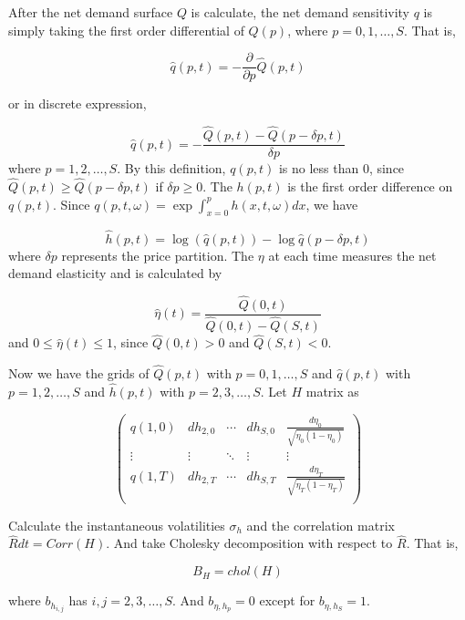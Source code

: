 \documentclass{article}
\begin{document}
After the net demand surface $Q$ is calculate, the net demand sensitivity $q$ is simply taking the first order differential of $Q(p)$, where $p = 0,1,\ldots,S$. That is,

$$
\hat{q}(p,t) = -\frac{\partial}{\partial p} \hat{Q}(p, t)
$$

or in discrete expression,

$$
\hat{q}(p,t) = - \frac{\hat{Q}(p, t) - \hat{Q}(p - \delta p, t)}{\delta p}
$$
where $p=1,2,\ldots,S$. By this definition, $q(p,t)$ is no less than 0, since $\hat{Q}(p, t) \geq \hat{Q}(p - \delta p, t)$ if $\delta p \geq 0$. The $h(p,t)$ is the first order difference on $q(p, t)$. Since $q(p,t,\omega ) =\exp{\int_{x=0}^{p}h(x,t,\omega )dx}$, we have

$$
\hat{h}(p,t) = \log(\hat{q}(p,t)) - \log{\hat{q}(p-\delta p,t)}
$$
where $\delta p$ represents the price partition. The $\eta$ at each time measures the net demand elasticity and is calculated by

$$
\hat{\eta}(t) = \frac{\hat{Q}(0, t)}{\hat{Q}(0, t) - \hat{Q}(S, t)}
$$
and $0 \leq \hat{\eta}(t) \leq 1$, since $\hat{Q}(0, t) > 0$ and $\hat{Q}(S, t)<0$.


Now we have the grids of $\hat{Q}(p,t)$ with $p = 0,1,\ldots, S$ and $\hat{q}(p,t)$ with $p = 1,2,\ldots, S$ and $\hat{h}(p,t)$ with $p = 2,3,\ldots, S$. Let $H$ matrix as

$$
\left(
  \begin{array}{ccccc}
    q(1,0) & dh_{2,0} & \cdots & dh_{S,0} & \frac{d\eta_{0}}{\sqrt{\eta_{0}(1-\eta_{0})}} \\
    \vdots & \vdots & \ddots & \vdots & \vdots \\
    q(1,T) & dh_{2,T} & \cdots & dh_{S,T} & \frac{d\eta_{T}}{\sqrt{\eta_{T}(1-\eta_{T})}}  \\
  \end{array}
\right)
$$

Calculate the instantaneous volatilities $\sigma_h$ and the correlation matrix $\hat{R}dt = Corr(H)$. And take Cholesky decomposition with respect to $\hat{R}$. That is,

$$
B_{H} = chol(H)
$$

where $b_{h_{i,j}}$ has $i,j = 2,3,\ldots,S$. And $b_{\eta,h_p}=0$ except for $b_{\eta,h_S}=1$.
\end{document}

